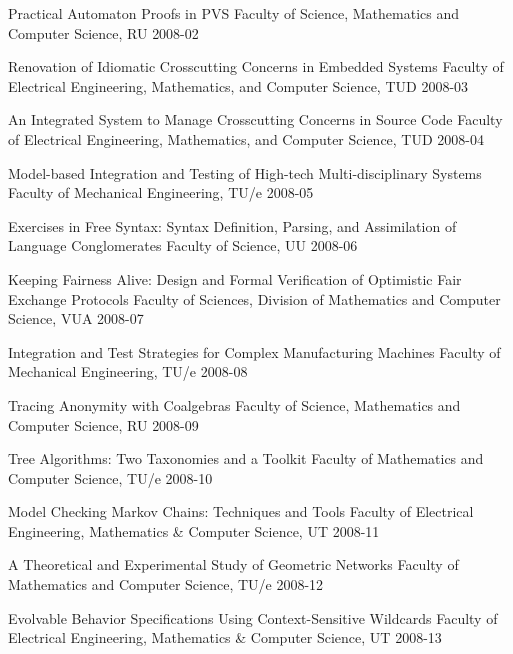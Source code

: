 \begin{multicols}{2}
         {Practical Automaton Proofs in PVS}
         {Faculty of Science, Mathematics and Computer Science, RU}
         {2008-02}

         {Renovation of Idiomatic Crosscutting Concerns in Embedded Systems}
         {Faculty of Electrical Engineering, Mathematics, and Computer Science, TUD}
         {2008-03}

         {An Integrated System to Manage Crosscutting Concerns in Source Code}
         {Faculty of Electrical Engineering, Mathematics, and Computer Science, TUD}
         {2008-04}

         {Model-based Integration and Testing of High-tech Multi-disciplinary Systems}
         {Faculty of Mechanical Engineering, TU/e}
         {2008-05}

         {Exercises in Free Syntax: Syntax Definition, Parsing, and Assimilation of Language Conglomerates}
         {Faculty of Science, UU}
         {2008-06}

         {Keeping Fairness Alive: Design and Formal Verification of Optimistic Fair Exchange Protocols}
         {Faculty of Sciences, Division of Mathematics and Computer Science, VUA}
         {2008-07}

         {Integration and Test Strategies for Complex Manufacturing Machines}
         {Faculty of Mechanical Engineering, TU/e}
         {2008-08}

         {Tracing Anonymity with Coalgebras}
         {Faculty of Science, Mathematics and Computer Science, RU}
         {2008-09}

         {Tree Algorithms: Two Taxonomies and a Toolkit}
         {Faculty of Mathematics and Computer Science, TU/e}
         {2008-10}

         {Model Checking Markov Chains: Techniques and Tools}
         {Faculty of Electrical Engineering, Mathematics \& Computer Science, UT}
         {2008-11}

         {A Theoretical and Experimental Study of Geometric Networks}
     {Faculty of Mathematics and Computer Science, TU/e}
         {2008-12}

         {Evolvable Behavior Specifications Using Context-Sensitive Wildcards}
         {Faculty of Electrical Engineering, Mathematics \& Computer Science, UT}
         {2008-13}


\end{multicols}
